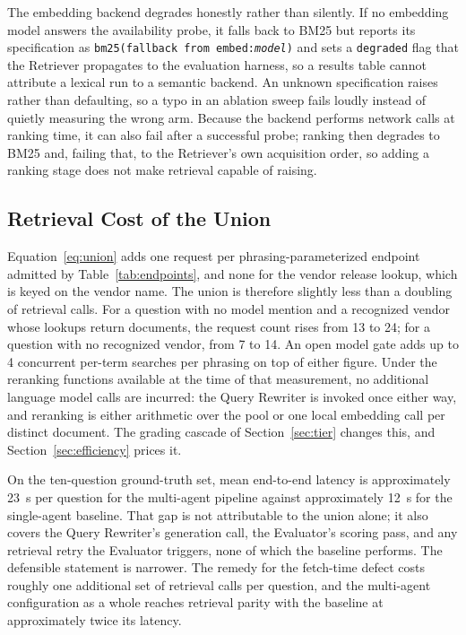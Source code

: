 \documentclass[acmsmall,review,anonymous,screen]{acmart}
\begin{document}
The embedding backend degrades honestly rather than silently. If no
embedding model answers the availability probe, it falls back to BM25
but reports its specification as \texttt{bm25(fallback from
embed:\textit{model})} and sets a \texttt{degraded} flag that the
Retriever propagates to the evaluation harness, so a results table
cannot attribute a lexical run to a semantic backend. An unknown
specification raises rather than defaulting, so a typo in an ablation
sweep fails loudly instead of quietly measuring the wrong arm. Because
the backend performs network calls at ranking time, it can also fail
after a successful probe; ranking then degrades to BM25 and, failing
that, to the Retriever's own acquisition order, so adding a ranking
stage does not make retrieval capable of raising.

\subsection{Retrieval Cost of the Union}\label{sec:retrieval-cost}

Equation~\eqref{eq:union} adds one request per phrasing-parameterized
endpoint admitted by Table~\ref{tab:endpoints}, and none for the vendor
release lookup, which is keyed on the vendor name. The union is
therefore slightly less than a doubling of retrieval calls. For a
question with no model mention and a recognized vendor whose lookups
return documents, the request count rises from 13 to 24; for a question
with no recognized vendor, from 7 to 14. An open model gate adds up to
4 concurrent per-term searches per phrasing on top of either figure. Under the reranking
functions available at the time of that measurement, no additional
language model calls are incurred: the Query Rewriter is
invoked once either way, and reranking is either arithmetic over the
pool or one local embedding call per distinct document. The grading
cascade of Section~\ref{sec:tier} changes this, and
Section~\ref{sec:efficiency} prices it.

On the ten-question ground-truth set, mean end-to-end latency is
approximately 23~s per question for the multi-agent pipeline against
approximately 12~s for the single-agent baseline. That gap is not
attributable to the union alone; it also covers the Query Rewriter's
generation call, the Evaluator's scoring pass, and any retrieval retry
the Evaluator triggers, none of which the baseline performs. The
defensible statement is narrower. The remedy for the fetch-time defect
costs roughly one additional set of retrieval calls per question, and
the multi-agent configuration as a whole reaches retrieval parity with
the baseline at approximately twice its latency.
\end{document}
